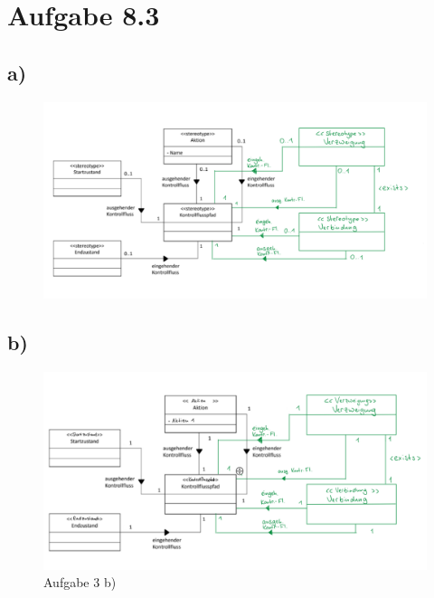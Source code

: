 \documentclass{article}
\begin{document}
	
	\newpage	
	\section*{Aufgabe 8.3}
		\subsection*{a)}
			\begin{figure}[h!]
				\includegraphics[width=\linewidth]{exercise_8_3_a.png}
				\label{fig:exercise_8_3_a.png}
			\end{figure}
		
		\subsection*{b)}
			\begin{figure}[h!]
				\includegraphics[width=\linewidth]{exercise_8_3_b.png}
				\caption{Aufgabe 3 b)}
				\label{fig:exercise_8_3_b.png}
			\end{figure}
		
\end{document}
